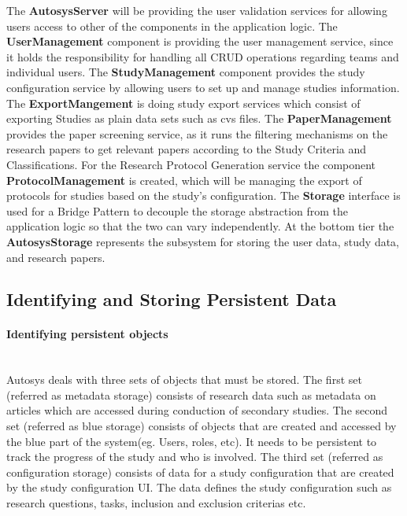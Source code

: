The \textbf{AutosysServer} will be providing the user validation services for allowing users access to other of the components in the application logic. 
The \textbf{UserManagement} component is providing the user management service, since it holds the responsibility for handling all CRUD operations regarding teams and individual users. The \textbf{StudyManagement} component  provides the study configuration service by allowing users to set up and manage studies information.
The \textbf{ExportMangement} is doing study export services which consist of exporting Studies as plain data sets such as cvs files.
The \textbf{PaperManagement} provides the paper screening service, as it runs the filtering mechanisms on the research papers to get relevant papers according to the Study Criteria and Classifications.
For the Research Protocol Generation service the component \textbf{ProtocolManagement} is created, which will be managing the export of protocols for studies based on the study's configuration.
The\textbf{ Storage} interface is used for a Bridge Pattern to decouple the storage abstraction from the application logic so that the two can vary independently. At the bottom tier the \textbf{AutosysStorage} represents the subsystem for storing the user data, study data, and research papers.

\subsection{Identifying and Storing Persistent Data}
\paragraph{Identifying persistent objects}\mbox{}\\

Autosys deals with three sets of objects that must be stored.  The first set (referred as metadata storage) consists of research data such as metadata on articles which are accessed during conduction of secondary studies. The second set (referred as blue storage) consists of objects that are created and accessed by the blue part of the system(eg. Users, roles, etc). It needs to be persistent to track the progress of the study and who is involved. The third set (referred as configuration storage) consists of data for a study configuration that are created by the study configuration UI. The data defines the study configuration such as research questions, tasks, inclusion and exclusion criterias etc.\\\\ 

